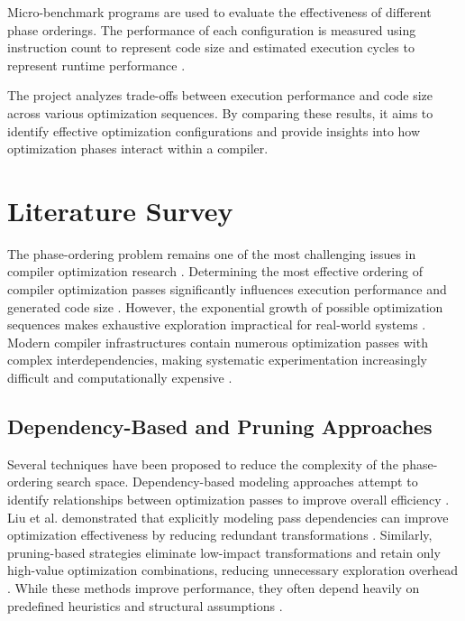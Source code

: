 \documentclass[conference]{IEEEtran}
\begin{document}
Micro-benchmark programs are used to evaluate the effectiveness of different phase orderings. The performance of each configuration is measured using instruction count to represent code size and estimated execution cycles to represent runtime performance \cite{ref10}.

The project analyzes trade-offs between execution performance and code size across various optimization sequences. By comparing these results, it aims to identify effective optimization configurations and provide insights into how optimization phases interact within a compiler.


\section{Literature Survey}

The phase-ordering problem remains one of the most challenging issues in compiler optimization research \cite{ref1}. Determining the most effective ordering of compiler optimization passes significantly influences execution performance and generated code size \cite{ref2}. However, the exponential growth of possible optimization sequences makes exhaustive exploration impractical for real-world systems \cite{ref19}. Modern compiler infrastructures contain numerous optimization passes with complex interdependencies, making systematic experimentation increasingly difficult and computationally expensive \cite{ref1}.

\subsection{Dependency-Based and Pruning Approaches}
Several techniques have been proposed to reduce the complexity of the phase-ordering search space. Dependency-based modeling approaches attempt to identify relationships between optimization passes to improve overall efficiency \cite{ref1}. Liu et al. demonstrated that explicitly modeling pass dependencies can improve optimization effectiveness by reducing redundant transformations \cite{ref1}. Similarly, pruning-based strategies eliminate low-impact transformations and retain only high-value optimization combinations, reducing unnecessary exploration overhead \cite{ref4}. While these methods improve performance, they often depend heavily on predefined heuristics and structural assumptions \cite{ref19}.
\end{document}
